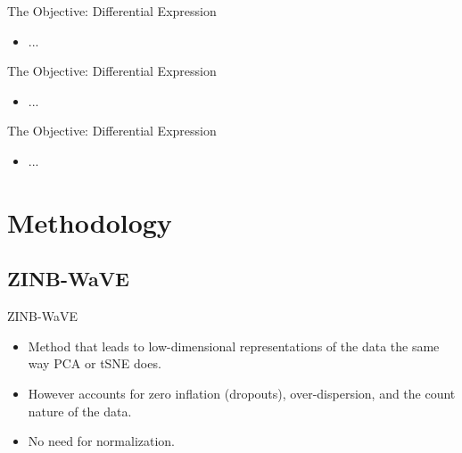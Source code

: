 \documentclass{beamer}
\begin{document}
\begin{frame}{The Objective: Differential Expression}

\begin{itemize}
  \itemsep10pt
  \item ...
\end{itemize}

\end{frame}


\begin{frame}{The Objective: Differential Expression}

\begin{itemize}
  \itemsep10pt
  \item ...
\end{itemize}

\end{frame}


\begin{frame}{The Objective: Differential Expression}

\begin{itemize}
  \itemsep10pt
  \item ...
\end{itemize}

\end{frame}

\section{Methodology}
\subsection{ZINB-WaVE}

\begin{frame}{ZINB-WaVE}

\begin{itemize}
  \itemsep10pt
  \item Method that leads to low-dimensional representations of the data the same way PCA or tSNE does. \pause
  \item However accounts for zero inflation (dropouts), over-dispersion, and the count nature of the data.
  \item No need for normalization.
\end{itemize}

\end{frame}
\end{document}
